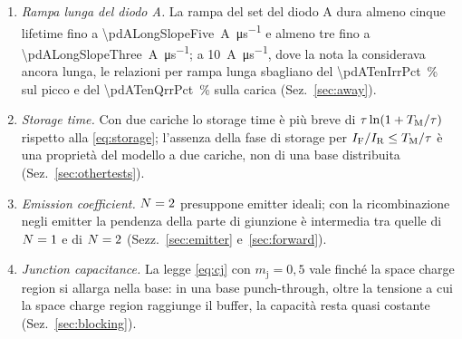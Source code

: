 \documentclass[10pt,a4paper]{scrartcl}
\let\newcommand\pdvaluedefine
\newcommand{\IF}{I_\mathrm{F}}
\newcommand{\IR}{I_\mathrm{R}}
\newcommand{\TM}{T_\mathrm{M}}
\newcommand{\Nem}{N}                          %
\begin{document}
\begin{enumerate}
\item \emph{Rampa lunga del diodo A.} La rampa del set del diodo A dura almeno cinque lifetime fino a \SI{\pdALongSlopeFive}{\ampere\per\micro\second} e almeno tre fino a \SI{\pdALongSlopeThree}{\ampere\per\micro\second}; a \SI{10}{\ampere\per\micro\second}, dove la nota la considerava ancora lunga, le relazioni per rampa lunga sbagliano del \SI{\pdATenIrrPct}{\percent} sul picco e del \SI{\pdATenQrrPct}{\percent} sulla carica (Sez.~\ref{sec:away}).
\item \emph{Storage time.} Con due cariche lo storage time è più breve di $\tau\ln(1+\TM/\tau)$ rispetto alla \eqref{eq:storage}; l'assenza della fase di storage per $\IF/\IR \leq \TM/\tau$ è una proprietà del modello a due cariche, non di una base distribuita (Sez.~\ref{sec:othertests}).
\item \emph{Emission coefficient.} $\Nem = 2$ presuppone emitter ideali; con la ricombinazione negli emitter la pendenza della parte di giunzione è intermedia tra quelle di $\Nem = 1$ e di $\Nem = 2$ (Sezz.~\ref{sec:emitter} e~\ref{sec:forward}).
\item \emph{Junction capacitance.} La legge \eqref{eq:cj} con $m_\mathrm{j} = 0,5$ vale finché la space charge region si allarga nella base: in una base punch-through, oltre la tensione a cui la space charge region raggiunge il buffer, la capacità resta quasi costante (Sez.~\ref{sec:blocking}).
\end{enumerate}
\end{document}
